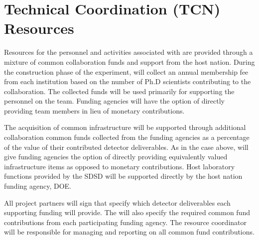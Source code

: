 \section{Technical Coordination (TCN) Resources}
\label{sec:tc_resources}

Resources for the personnel and activities associated with 
are provided through a mixture of common collaboration funds and
support from the host nation.  During the construction phase of the
experiment,  will collect an annual membership fee from
each institution based on the number of Ph.D scientists %
contributing to the
collaboration.  The collected funds will be used primarily for
supporting the personnel %
on the  team.  Funding
agencies will have the option of directly providing team members in
lieu of %
monetary contributions.

The acquisition of common infrastructure will be supported through
additional collaboration common funds collected from the funding
agencies as a percentage of the value of their contributed detector
deliverables.  As in the case above,  will give funding agencies %
the option of directly providing equivalently valued infrastructure
items as opposed to %
monetary contributions.  Host laboratory
functions provided by the SDSD will be supported directly by the host nation
funding agency, DOE.

All project partners will sign  that specify which detector
deliverables each %
supporting funding %
will provide. The  will also specify the required common fund
contributions from each  participating funding agency.  The
 resource coordinator will be responsible for managing and
reporting on all common fund contributions.